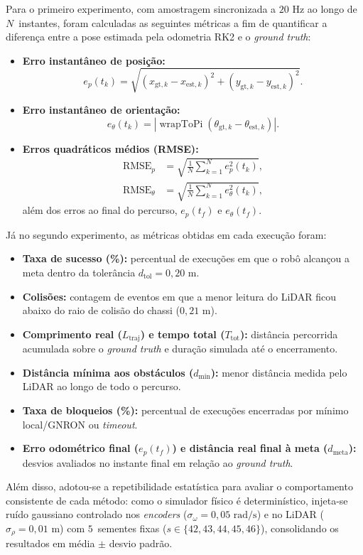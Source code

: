 Para o primeiro experimento, com amostragem sincronizada a $20\text{ Hz}$ ao longo de $N$~instantes, foram calculadas as seguintes métricas a fim de quantificar a diferença entre a pose estimada pela odometria RK2 e o \textit{ground truth}:
\begin{itemize}
    \item \textbf{Erro instantâneo de posição:}
    \[
    e_p(t_k) = \sqrt{(x_{\text{gt},k} - x_{\text{est},k})^2 + (y_{\text{gt},k} - y_{\text{est},k})^2}.
    \]
    \item \textbf{Erro instantâneo de orientação:}
    \[
    e_\theta(t_k) = \left|\operatorname{wrapToPi}(\theta_{\text{gt},k} - \theta_{\text{est},k})\right|.
    \]
    \item \textbf{Erros quadráticos médios (RMSE):}
    \[
    \begin{aligned}
    \text{RMSE}_p &= \sqrt{\frac{1}{N}\sum_{k=1}^{N} e_p^2(t_k)}, \\
    \text{RMSE}_\theta &= \sqrt{\frac{1}{N}\sum_{k=1}^{N} e_\theta^2(t_k)},
    \end{aligned}
    \]
    além dos erros ao final do percurso, $e_p(t_f)$ e $e_\theta(t_f)$.
\end{itemize}

Já no segundo experimento, as métricas obtidas em cada execução foram:
\begin{itemize}
    \item \textbf{Taxa de sucesso (\%):} percentual de execuções em que o robô alcançou a meta dentro da tolerância $d_{\text{tol}} = 0{,}20\text{ m}$.
    \item \textbf{Colisões:} contagem de eventos em que a menor leitura do LiDAR ficou abaixo do raio de colisão do chassi ($0{,}21\text{ m}$).
    \item \textbf{Comprimento real ($L_{\text{traj}}$) e tempo total ($T_{\text{tot}}$):} distância percorrida acumulada sobre o \textit{ground truth} e duração simulada até o encerramento.
    \item \textbf{Distância mínima aos obstáculos ($d_{\min}$):} menor distância medida pelo LiDAR ao longo de todo o percurso.
    \item \textbf{Taxa de bloqueios (\%):} percentual de execuções encerradas por mínimo local/GNRON ou \textit{timeout}.
    \item \textbf{Erro odométrico final ($e_p(t_f)$) e distância real final à meta ($d_{\text{meta}}$):} desvios avaliados no instante final em relação ao \textit{ground truth}.
\end{itemize}

Além disso, adotou-se a repetibilidade estatística para avaliar o comportamento consistente de cada método: como o simulador físico é determinístico, injeta-se ruído gaussiano controlado nos \textit{encoders} ($\sigma_\omega = 0{,}05\text{ rad/s}$) e no LiDAR ($\sigma_\rho = 0{,}01\text{ m}$) com $5$~sementes fixas ($s \in \{42, 43, 44, 45, 46\}$), consolidando os resultados em média $\pm$ desvio padrão.
